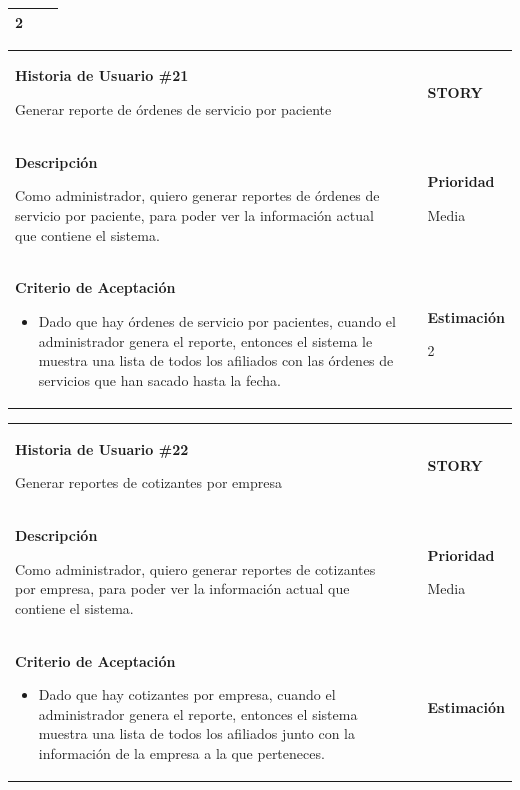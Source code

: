 \documentclass[12pt,a4paper]{article}
\begin{document}
\begin{center}
\begin{tabular}{| p{10cm} c p{2.5cm}|}
2 \\ 
\hline 
\end{tabular}
\vspace{5mm}

\begin{tabular}{| p{10cm} c p{2.5cm}|}
\hline 
\textbf{Historia de Usuario \#21}

Generar reporte de órdenes de servicio por paciente & & \textbf{{\Large STORY}} \\ 
\textbf{Descripción}

Como administrador, quiero generar reportes de órdenes de servicio por
paciente, para poder ver la información actual que contiene el sistema. &  & \textbf{Prioridad}

Media\\

\textbf{Criterio de Aceptación}

\begin{itemize}
\item Dado que hay órdenes de servicio por pacientes, cuando el
administrador genera el reporte, entonces el sistema le muestra
una lista de todos los afiliados con las órdenes de servicios que
han sacado hasta la fecha.
\end{itemize} & & \textbf{Estimación}

2 \\ 
\hline 
\end{tabular}
\vspace{5mm}

\begin{tabular}{| p{10cm} c p{2.5cm}|}
\hline 
\textbf{Historia de Usuario \#22}

Generar reportes de cotizantes por empresa & & \textbf{{\Large STORY}} \\ 
\textbf{Descripción}

Como administrador, quiero generar reportes de cotizantes por empresa,
para poder ver la información actual que contiene el sistema. &  & \textbf{Prioridad}

Media\\

\textbf{Criterio de Aceptación}

\begin{itemize}
\item Dado que hay cotizantes por empresa, cuando el administrador
genera el reporte, entonces el sistema muestra una lista de todos
los afiliados junto con la información de la empresa a la que
perteneces.
\end{itemize} & & \textbf{Estimación}


\end{tabular}
\end{center}
\end{document}
